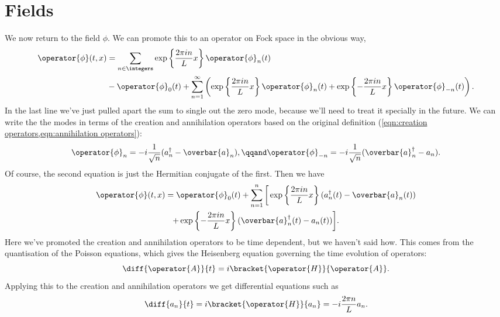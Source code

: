 \documentclass[fleqn]{NotesClass}
\newcommand{\hermit}{{\dagger}}
\begin{document}
    \section{Fields}
    We now return to the field \(\phi\).
    We can promote this to an operator on Fock space in the obvious way,
    \begin{align}
        \operator{\phi}(t, x) &= \sum_{n \in \integers} \exp\left\{ \frac{2\pi in}{L}x \right\} \operator{\phi}_n(t)\\
        &- \operator{\phi}_0(t) + \sum_{n=1}^{\infty} \left( \exp\left\{ \frac{2\pi in}{L}x \right\} \operator{\phi}_n(t) + \exp\left\{ -\frac{2\pi in}{L}x \right\} \operator{\phi}_{-n}(t) \right).
    \end{align}
    In the last line we've just pulled apart the sum to single out the zero mode, because we'll need to treat it specially in the future.
    We can write the the modes in terms of the creation and annihilation operators based on the original definition (\cref{eqn:creation operators,eqn:annihilation operators}):
    \begin{equation}
        \operator{\phi}_n = -i\frac{1}{\sqrt{n}} (a_n^{\hermit} - \overbar{a}_n), \qqand \operator{\phi}_{-n} = -i\frac{1}{\sqrt{n}}(\overbar{a}_n^{\hermit} - a_n). 
    \end{equation}
    Of course, the second equation is just the Hermitian conjugate of the first.
    Then we have
    \begin{multline}
        \operator{\phi}(t, x) = \operator{\phi}_0(t) + \sum_{n=1}^n \bigg[ \exp\left\{ \frac{2\pi in}{L}x \right\} (a_n^{\hermit}(t) - \overbar{a}_n(t))\\
        + \exp\left\{ -\frac{2\pi in}{L}x \right\} (\overbar{a}_n^{\hermit}(t) - a_n(t)) \bigg].
    \end{multline}
    Here we've promoted the creation and annihilation operators to be time dependent, but we haven't said how.
    This comes from the quantisation of the Poisson equations, which gives the Heisenberg equation governing the time evolution of operators:
    \begin{equation}
        \diff{\operator{A}}{t} = i \bracket{\operator{H}}{\operator{A}}.
    \end{equation}
    Applying this to the creation and annihilation operators we get differential equations such as
    \begin{equation}
        \diff{a_n}{t} = i\bracket{\operator{H}}{a_n} = -i\frac{2\pi n}{L}a_n.
    \end{equation}
\end{document}
